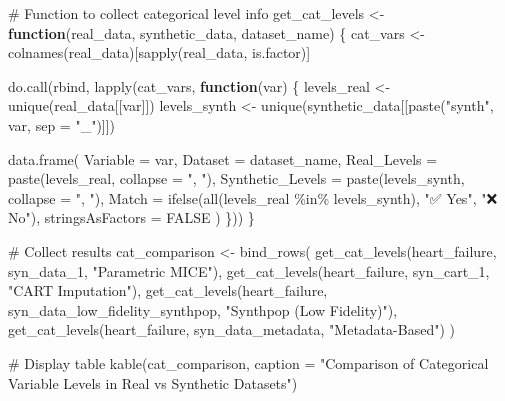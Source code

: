 \documentclass[
  letterpaper,
  DIV=11,
  numbers=noendperiod]{scrartcl}
\newenvironment{Shaded}{\begin{snugshade}}{\end{snugshade}}
\newcommand{\AttributeTok}[1]{\textcolor[rgb]{0.40,0.45,0.13}{#1}}
\newcommand{\CommentTok}[1]{\textcolor[rgb]{0.37,0.37,0.37}{#1}}
\newcommand{\ConstantTok}[1]{\textcolor[rgb]{0.56,0.35,0.01}{#1}}
\newcommand{\ControlFlowTok}[1]{\textcolor[rgb]{0.00,0.23,0.31}{\textbf{#1}}}
\newcommand{\FunctionTok}[1]{\textcolor[rgb]{0.28,0.35,0.67}{#1}}
\newcommand{\NormalTok}[1]{\textcolor[rgb]{0.00,0.23,0.31}{#1}}
\newcommand{\OtherTok}[1]{\textcolor[rgb]{0.00,0.23,0.31}{#1}}
\newcommand{\SpecialCharTok}[1]{\textcolor[rgb]{0.37,0.37,0.37}{#1}}
\newcommand{\StringTok}[1]{\textcolor[rgb]{0.13,0.47,0.30}{#1}}
\begin{document}
\begin{Shaded}
\begin{Highlighting}[]
\CommentTok{\# Function to collect categorical level info}
\NormalTok{get\_cat\_levels }\OtherTok{\textless{}{-}} \ControlFlowTok{function}\NormalTok{(real\_data, synthetic\_data, dataset\_name) \{}
\NormalTok{  cat\_vars }\OtherTok{\textless{}{-}} \FunctionTok{colnames}\NormalTok{(real\_data)[}\FunctionTok{sapply}\NormalTok{(real\_data, is.factor)]}
  
  \FunctionTok{do.call}\NormalTok{(rbind, }\FunctionTok{lapply}\NormalTok{(cat\_vars, }\ControlFlowTok{function}\NormalTok{(var) \{}
\NormalTok{    levels\_real }\OtherTok{\textless{}{-}} \FunctionTok{unique}\NormalTok{(real\_data[[var]])}
\NormalTok{    levels\_synth }\OtherTok{\textless{}{-}} \FunctionTok{unique}\NormalTok{(synthetic\_data[[}\FunctionTok{paste}\NormalTok{(}\StringTok{"synth"}\NormalTok{, var, }\AttributeTok{sep =} \StringTok{"\_"}\NormalTok{)]])}
    
    \FunctionTok{data.frame}\NormalTok{(}
      \AttributeTok{Variable =}\NormalTok{ var,}
      \AttributeTok{Dataset =}\NormalTok{ dataset\_name,}
      \AttributeTok{Real\_Levels =} \FunctionTok{paste}\NormalTok{(levels\_real, }\AttributeTok{collapse =} \StringTok{", "}\NormalTok{),}
      \AttributeTok{Synthetic\_Levels =} \FunctionTok{paste}\NormalTok{(levels\_synth, }\AttributeTok{collapse =} \StringTok{", "}\NormalTok{),}
      \AttributeTok{Match =} \FunctionTok{ifelse}\NormalTok{(}\FunctionTok{all}\NormalTok{(levels\_real }\SpecialCharTok{\%in\%}\NormalTok{ levels\_synth), }\StringTok{"✅ Yes"}\NormalTok{, }\StringTok{"❌ No"}\NormalTok{),}
      \AttributeTok{stringsAsFactors =} \ConstantTok{FALSE}
\NormalTok{    )}
\NormalTok{  \}))}
\NormalTok{\}}

\CommentTok{\# Collect results}
\NormalTok{cat\_comparison }\OtherTok{\textless{}{-}} \FunctionTok{bind\_rows}\NormalTok{(}
  \FunctionTok{get\_cat\_levels}\NormalTok{(heart\_failure, syn\_data\_1, }\StringTok{"Parametric MICE"}\NormalTok{),}
  \FunctionTok{get\_cat\_levels}\NormalTok{(heart\_failure, syn\_cart\_1, }\StringTok{"CART Imputation"}\NormalTok{),}
  \FunctionTok{get\_cat\_levels}\NormalTok{(heart\_failure, syn\_data\_low\_fidelity\_synthpop, }\StringTok{"Synthpop (Low Fidelity)"}\NormalTok{),}
  \FunctionTok{get\_cat\_levels}\NormalTok{(heart\_failure, syn\_data\_metadata, }\StringTok{"Metadata{-}Based"}\NormalTok{)}
\NormalTok{)}

\CommentTok{\# Display table}
\FunctionTok{kable}\NormalTok{(cat\_comparison,}
      \AttributeTok{caption =} \StringTok{"Comparison of Categorical Variable Levels in Real vs Synthetic Datasets"}\NormalTok{)}
\end{Highlighting}
\end{Shaded}
\end{document}
